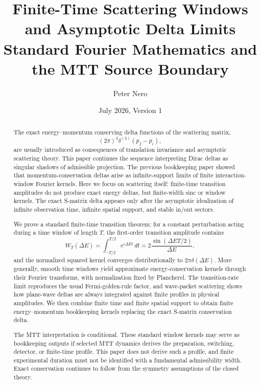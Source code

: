 \documentclass[11pt]{article}
\title{Finite-Time Scattering Windows and Asymptotic Delta Limits\\
\large Standard Fourier Mathematics and the MTT Source Boundary}
\author{Peter Nero}
\date{July 2026, Version 1}
\begin{document}
\maketitle

\begin{abstract}
The exact energy--momentum conserving delta functions of the scattering matrix,
\[
(2\pi)^4\delta^{(4)}(p_f-p_i),
\]
are usually introduced as consequences of translation invariance and asymptotic scattering theory.  This paper continues the sequence interpreting Dirac deltas as singular shadows of admissible projection.  The previous bookkeeping paper showed that momentum-conservation deltas arise as infinite-support limits of finite interaction-window Fourier kernels.  Here we focus on scattering itself: finite-time transition amplitudes do not produce exact energy deltas, but finite-width sinc or window kernels.  The exact S-matrix delta appears only after the asymptotic idealization of infinite observation time, infinite spatial support, and stable in/out sectors.

We prove a standard finite-time transition theorem: for a constant perturbation acting during a time window of length \(T\), the first-order transition amplitude contains
\[
W_T(\Delta E)=\int_{-T/2}^{T/2}e^{i\Delta E t}\,dt
=2\frac{\sin(\Delta E T/2)}{\Delta E},
\]
and the normalized squared kernel converges distributionally to \(2\pi\delta(\Delta E)\).  More generally, smooth time windows yield approximate energy-conservation kernels through their Fourier transforms, with normalization fixed by Plancherel.  The transition-rate limit reproduces the usual Fermi-golden-rule factor, and wave-packet scattering shows how plane-wave deltas are always integrated against finite profiles in physical amplitudes.  We then combine finite time and finite spatial support to obtain finite energy--momentum bookkeeping kernels replacing the exact S-matrix conservation delta.

The MTT interpretation is conditional.  These standard window kernels may serve as
bookkeeping outputs if selected MTT dynamics derives the preparation, switching, detector,
or finite-time profile.  This paper does not derive such a profile, and finite experimental
duration must not be identified with a fundamental admissibility width.  Exact conservation
continues to follow from the symmetry assumptions of the closed theory.
\end{abstract}
\end{document}
